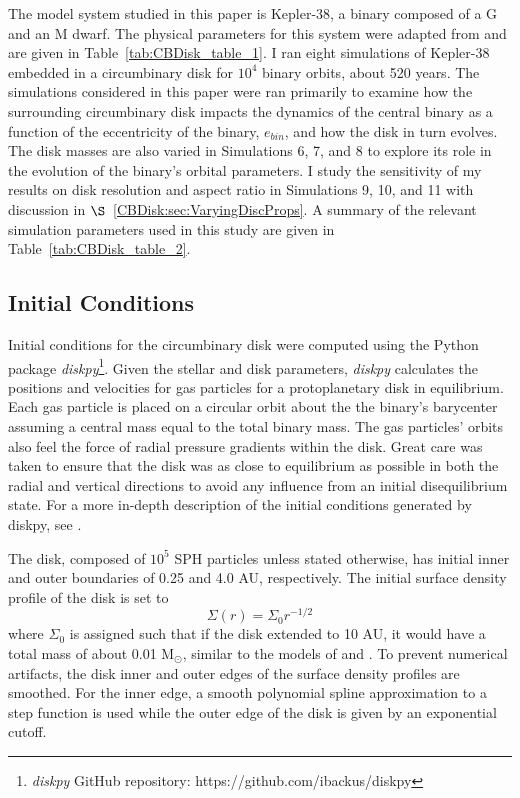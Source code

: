 The model system studied in this paper is Kepler-38, a binary composed of a G and an M dwarf.  The physical parameters for this 
system were adapted from \citet{Orosz2012} and are given in Table~\ref{tab:CBDisk_table_1}.  I ran eight simulations of Kepler-38 embedded in a 
circumbinary disk for $10^4$ binary orbits, about 520 years.  The simulations considered in this paper were ran primarily to examine how 
the surrounding circumbinary disk impacts the dynamics of the central
binary as a function of the eccentricity of the binary, $e_{bin}$, and
how the disk in turn evolves.  The disk masses are also varied in Simulations 6, 7, and 8 to explore its role in the evolution of the binary's orbital parameters.  
I study the sensitivity of my results on disk resolution and aspect ratio in Simulations 9, 10, and 11 with discussion in $\S$~\ref{CBDisk:sec:VaryingDiscProps}.  A summary of the relevant simulation parameters used in this study are given in Table~\ref{tab:CBDisk_table_2}. 

\subsection{Initial Conditions}

Initial conditions for the circumbinary disk were computed using the
Python package {\em diskpy}\footnote{{\em diskpy} GitHub repository: https://github.com/ibackus/diskpy}.  
Given the stellar and disk parameters, {\em diskpy}
calculates the positions and velocities for gas particles for a
protoplanetary disk in equilibrium.   Each gas particle is placed on a
circular orbit about the the binary's barycenter assuming a central
mass equal to the total binary mass.  
The gas particles' orbits also feel the force of radial pressure gradients within the disk.  Great care was taken to ensure that the disk
was as close to equilibrium as possible in both the radial and vertical directions to avoid any influence from an initial disequilibrium
state.  For a more in-depth description of the initial conditions generated by diskpy, see \citet{Backus2016}.

The disk, composed of $10^5$ SPH particles unless stated otherwise, has initial inner and outer boundaries of 0.25 and 4.0 AU,
respectively.  The initial surface density profile of the disk is set to 
\begin{equation}
\Sigma(r) = \Sigma_0 r^{-1/2}
\end{equation}
 where $\Sigma_0$ is assigned such that if the disk extended to 10 AU, it would have a total mass of about 0.01 
M$_{\odot}$, similar to the models of \citet{Pierens2007} and \citet{Kley2014}.  To prevent numerical 
artifacts, the disk inner and outer edges of the surface density profiles are smoothed.  For the inner edge, a smooth polynomial spline approximation to a step function is used while the outer edge of the disk is given by an exponential cutoff.
 
